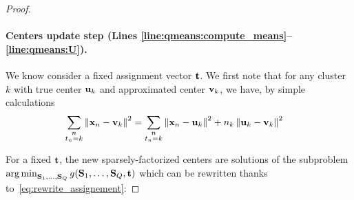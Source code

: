 \begin{proof}
\paragraph{Centers update step (Lines \ref{line:qmeans:compute_means}--\ref{line:qmeans:U}).} We know consider a fixed assignment vector ${\mathbf{t}}$. We first note that for any cluster $k$ with true center ${\mathbf{u}}_k$ and approximated center ${\mathbf{v}}_k$, we have, by simple calculations
\begin{align}
    \label{eq:rewrite_assignement}
	\sum_{\substack{n\\t_n = k}} \left \| {\mathbf{x}}_n -{\mathbf{v}}_k\right \|^2
	&= \sum_{\substack{n\\t_n = k}} \left \| {\mathbf{x}}_n-{\mathbf{u}}_k\right \|^2 + n_k \left \| {\mathbf{u}}_k-{\mathbf{v}}_k\right \|^2
\end{align}


For a fixed ${\mathbf{t}}$, the new sparsely-factorized centers are solutions of the subproblem $\operatorname*{arg\,min}_{{\mathbf{S}}_1, \ldots,{\mathbf{S}}_Q} g({\mathbf{S}}_1, \ldots,{\mathbf{S}}_Q, {\mathbf{t}})$ which can be rewritten thanks to~\eqref{eq:rewrite_assignement}:
%




\end{proof}
